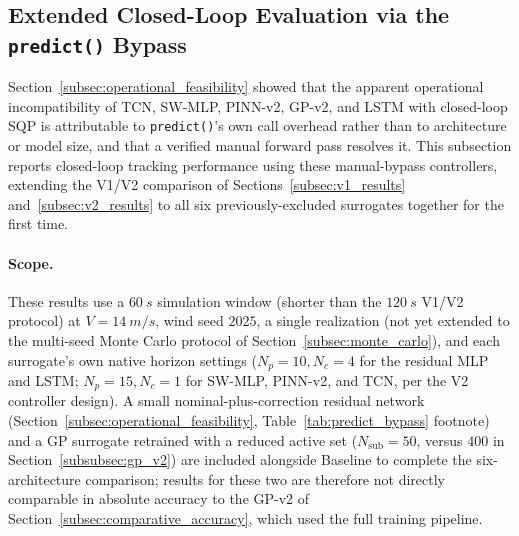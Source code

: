 \subsection{Extended Closed-Loop Evaluation via the \texttt{predict()} Bypass}
\label{subsec:bypass_closed_loop}

Section~\ref{subsec:operational_feasibility} showed that the apparent
operational incompatibility of TCN, SW-MLP, PINN-v2, GP-v2, and LSTM
with closed-loop SQP is attributable to \texttt{predict()}'s own call
overhead rather than to architecture or model size, and that a verified
manual forward pass resolves it. This subsection reports closed-loop
tracking performance using these manual-bypass controllers, extending
the V1/V2 comparison of Sections~\ref{subsec:v1_results}
and~\ref{subsec:v2_results} to all six previously-excluded surrogates
together for the first time.

\paragraph{Scope.} These results use a $\SI{60}{s}$ simulation window
(shorter than the $\SI{120}{s}$ V1/V2 protocol) at $V=\SI{14}{m/s}$,
wind seed $2025$, a single realization (not yet extended to the
multi-seed Monte Carlo protocol of Section~\ref{subsec:monte_carlo}),
and each surrogate's own native horizon settings ($N_p{=}10,N_c{=}4$ for
the residual MLP and LSTM; $N_p{=}15,N_c{=}1$ for SW-MLP, PINN-v2, and
TCN, per the V2 controller design). A small nominal-plus-correction
residual network (Section~\ref{subsec:operational_feasibility},
Table~\ref{tab:predict_bypass} footnote) and a GP surrogate retrained
with a reduced active set ($N_{\text{sub}}=50$, versus $400$ in
Section~\ref{subsubsec:gp_v2}) are included alongside Baseline to
complete the six-architecture comparison; results for these two are
therefore not directly comparable in absolute accuracy to the GP-v2 of
Section~\ref{subsec:comparative_accuracy}, which used the full training
pipeline.


